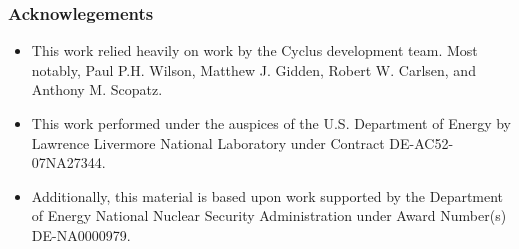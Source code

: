 
\begin{frame}[fragile]
  \frametitle{Acknowlegements}
\begin{itemize}
\item This work relied heavily on work by the Cyclus development team. Most notably, 
Paul P.H. Wilson, Matthew J. Gidden, Robert W. Carlsen, and Anthony M. Scopatz. 
\item This work performed under the auspices of the U.S. Department of Energy by
Lawrence Livermore National Laboratory under Contract DE-AC52-07NA27344.
\item Additionally, this material is based upon work supported by the Department of 
Energy National Nuclear Security Administration under Award Number(s) 
DE-NA0000979. %
\end{itemize}
\end{frame}
